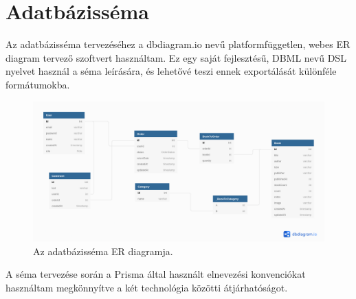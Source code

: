\section{Adatbázisséma}

Az adatbázisséma tervezéséhez a dbdiagram.io nevű platformfüggetlen, webes ER diagram tervező szoftvert használtam.
Ez egy saját fejlesztésű, DBML nevű DSL nyelvet használ a séma leírására, és lehetővé teszi ennek exportálását különféle formátumokba.

\begin{figure}[!ht]
\centering
\includegraphics[width=150mm, keepaspectratio]{figures/dbschema.png}
\caption{Az adatbázisséma ER diagramja.}
\label{fig:DBSchema}
\end{figure}

A séma tervezése során a Prisma által használt elnevezési konvenciókat használtam megkönnyítve a két technológia közötti átjárhatóságot.

